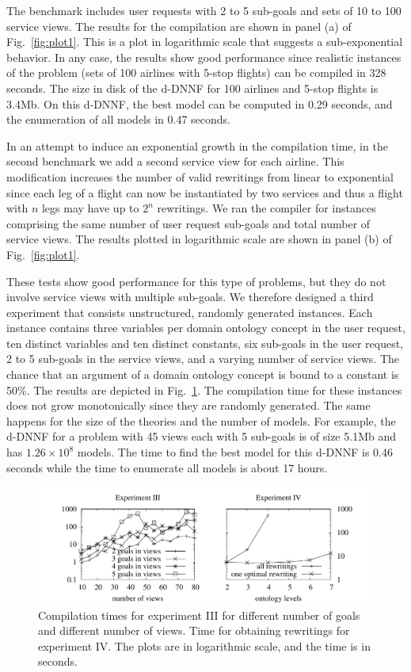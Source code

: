 \documentclass{llncs}
\begin{document}
The benchmark includes user requests with 2 to 5 sub-goals and
sets of 10 to 100 service views. The results for the compilation are
shown in panel (a) of Fig.~\ref{fig:plot1}. This is a plot in logarithmic
scale that suggests a sub-exponential behavior. In any case, the results
show good performance since realistic instances of the problem (sets of 100
airlines with 5-stop flights) can be compiled in 328 seconds.
The size in disk of the d-DNNF for 100 airlines and 5-stop flights is 3.4Mb.
On this d-DNNF, the best model can be computed in 0.29 seconds,
and the enumeration of all models in 0.47 seconds.

In an attempt to induce an exponential growth in the compilation time,
in the second benchmark we add a second service view for each airline.
This modification increases the number of valid rewritings from linear
to exponential since each leg of a flight can now be instantiated by two
services and thus a flight with $n$ legs may have up to $2^n$
rewritings.
We ran the compiler for instances comprising the same number of user request
sub-goals and total number of service views. The results plotted in
logarithmic scale are shown in panel (b) of Fig.~\ref{fig:plot1}.

These tests show good performance for this type of problems, but they do not
involve service views with multiple sub-goals. We therefore designed a
third experiment that consists unstructured, randomly generated instances.
Each instance contains three variables per domain ontology concept in the user request, ten distinct
variables and ten distinct constants, six sub-goals in the user request,
2 to 5 sub-goals in the service views, and a varying number of service views.
The chance that an argument of a domain ontology concept is bound to a constant is 50\%.
The results are depicted in Fig.~\ref{fig:plot4}.
The compilation time for these instances does not grow monotonically
since they are randomly generated. The same happens for the size of
the theories and the number of models. For example, the d-DNNF for 
a problem with 45 views each with 5 sub-goals is of size 5.1Mb and has
$1.26\times 10^8$ models. The time to find the best model for
this d-DNNF is 0.46 seconds while the time to enumerate all models
is about 17 hours.

\begin{figure}[t]
\centering
\includegraphics[width=.9\textwidth]{plots/plot4}
\caption{Compilation times for experiment III for different number of goals
and different number of views. Time for obtaining rewritings for experiment IV. The plots are in logarithmic scale, and the time
is in seconds. }
\label{fig:plot4}
\end{figure}
\end{document}
